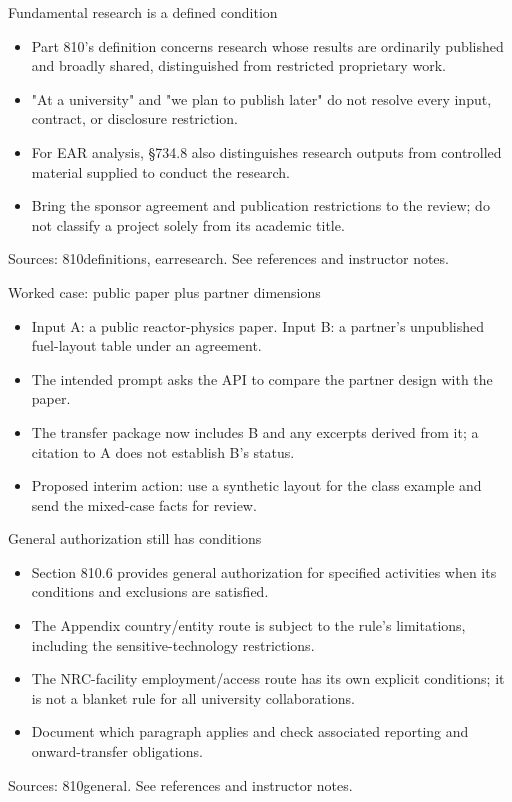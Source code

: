 \documentclass[aspectratio=169,11pt]{beamer}
\begin{document}
\begin{frame}[t,fragile]{Fundamental research is a defined condition}
\fontsize{11.5}{14}\selectfont
\begin{itemize}\setlength{\itemsep}{2mm}
\item Part 810's definition concerns research whose results are ordinarily published and broadly shared, distinguished from restricted proprietary work.
\item "At a university" and "we plan to publish later" do not resolve every input, contract, or disclosure restriction.
\item For EAR analysis, \S{}734.8 also distinguishes research outputs from controlled material supplied to conduct the research.
\item Bring the sponsor agreement and publication restrictions to the review; do not classify a project solely from its academic title.
\end{itemize}
\vfill{\fontsize{6.5}{8}\selectfont\color{UTgray} Sources: 810definitions, earresearch. See references and instructor notes.\par}
\end{frame}
\begin{frame}[t,fragile]{Worked case: public paper plus partner dimensions}
\fontsize{11.5}{14}\selectfont
\begin{itemize}\setlength{\itemsep}{2mm}
\item Input A: a public reactor-physics paper. Input B: a partner's unpublished fuel-layout table under an agreement.
\item The intended prompt asks the API to compare the partner design with the paper.
\item The transfer package now includes B and any excerpts derived from it; a citation to A does not establish B's status.
\item Proposed interim action: use a synthetic layout for the class example and send the mixed-case facts for review.
\end{itemize}
\end{frame}
\begin{frame}[t,fragile]{General authorization still has conditions}
\fontsize{11.5}{14}\selectfont
\begin{itemize}\setlength{\itemsep}{2mm}
\item Section 810.6 provides general authorization for specified activities when its conditions and exclusions are satisfied.
\item The Appendix country/entity route is subject to the rule's limitations, including the sensitive-technology restrictions.
\item The NRC-facility employment/access route has its own explicit conditions; it is not a blanket rule for all university collaborations.
\item Document which paragraph applies and check associated reporting and onward-transfer obligations.
\end{itemize}
\vfill{\fontsize{6.5}{8}\selectfont\color{UTgray} Sources: 810general. See references and instructor notes.\par}
\end{frame}
\end{document}
